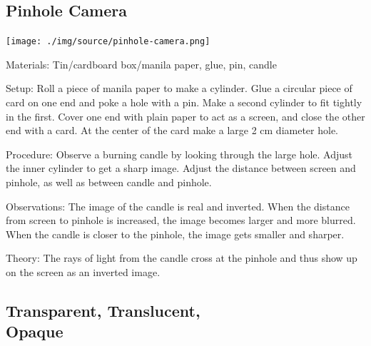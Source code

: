 \begin{multicols}{2}
\subsection{Pinhole Camera}

\begin{center}
\texttt{[image: ./img/source/pinhole-camera.png]}
\end{center}

\begin{description*}
\item[Materials:]{Tin/cardboard box/manila paper, glue, pin, candle}
\item[Setup:]{Roll a piece of manila paper to make a cylinder. Glue a circular piece of card on one end and poke a hole with a pin. Make a second cylinder to fit tightly in the first. Cover one end with plain paper to act as a screen, and close the other end with a card. At the center of the card make a large 2 cm diameter hole.}
\item[Procedure:]{Observe a burning candle by looking through the large hole. Adjust the inner cylinder to get a sharp image. Adjust the distance between screen and pinhole, as well as between candle and pinhole.}
\item[Observations:]{The image of the candle is real and inverted. When the distance from screen to pinhole is increased, the image becomes larger and more blurred. When the candle is closer to the pinhole, the image gets smaller and sharper.}
\item[Theory:]{The rays of light from the candle cross at the pinhole and thus show up on the screen as an inverted image.}
\end{description*}

\subsection[Transparent, Translucent, Opaque]{Transparent, Translucent, \hfill \\ Opaque}



\end{multicols}
